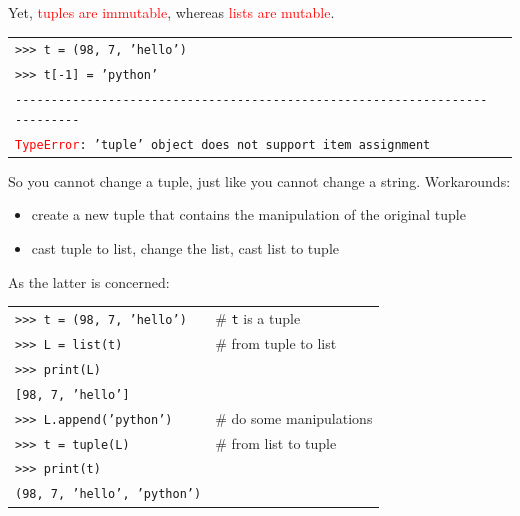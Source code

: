 \documentclass[t,handout,9pt]{beamer}
\begin{document}
\begin{frame}
\vfill
Yet, \textcolor{red}{tuples are immutable}, whereas \textcolor{red}{lists are mutable}.
\begin{table}[]
\begin{flushleft}
\begin{tabular}{ll}
\texttt{>{}>{}> t = (98, 7, 'hello')} & \\
\texttt{>{}>{}> t[-1] = 'python'} & \\
\texttt{-{}-{}-{}-{}-{}-{}-{}-{}-{}-{}-{}-{}-{}-{}-{}-{}-{}-{}-{}-{}-{}-{}-{}-{}-{}-{}-{}-{}-{}-{}-{}-{}-{}-{}-{}-{}-{}-{}-{}-{}-{}-{}-{}-{}-{}-{}-{}-{}-{}-{}-{}-{}-{}-{}-{}-{}-{}-{}-{}-{}-{}-{}-{}-{}-{}-{}-{}-{}-{}-{}-{}-{}-{}-{}-{}} &  \\
\texttt{\textcolor{red}{TypeError}: 'tuple' object does not support item assignment} &  \\
\end{tabular}
\end{flushleft}
\end{table}
\vfill
So you cannot change a tuple, just like you cannot change a string. Workarounds:
\begin{itemize}
	\item create a new tuple that contains the manipulation of the original tuple
	\item cast tuple to list, change the list, cast list to tuple
\end{itemize}
\vfill
As the latter is concerned:
\begin{table}[]
\begin{flushleft}
\begin{tabular}{ll}
\texttt{>{}>{}> t = (98, 7, 'hello')} & \# \texttt{t} is a tuple\\
\texttt{>{}>{}> L = list(t)} & \# from tuple to list\\
\texttt{>{}>{}> print(L)} & \\
\texttt{[98, 7, 'hello']} & \\
\texttt{>{}>{}> L.append('python')} & \# do some manipulations\\
\texttt{>{}>{}> t = tuple(L)} & \# from list to tuple\\
\texttt{>{}>{}> print(t)} & \\
\texttt{(98, 7, 'hello', 'python')} & \\
\end{tabular}
\end{flushleft}
\end{table}
\vfill
\end{frame}
\end{document}
